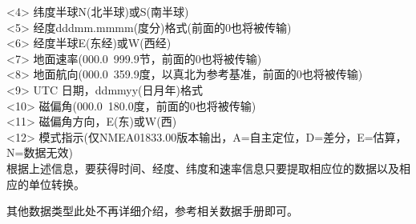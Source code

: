 \documentclass[a4paper, 12pt]{article}
\begin{document}
<4> 纬度半球N(北半球)或S(南半球)\\
<5> 经度dddmm.mmmm(度分)格式(前面的0也将被传输)\\
<6> 经度半球E(东经)或W(西经)\\
<7> 地面速率(000.0~999.9节，前面的0也将被传输)\\
<8> 地面航向(000.0~359.9度，以真北为参考基准，前面的0也将被传输)\\
<9> UTC 日期，ddmmyy(日月年)格式\\
<10> 磁偏角(000.0~180.0度，前面的0也将被传输)\\
<11> 磁偏角方向，E(东)或W(西)\\
<12> 模式指示(仅NMEA01833.00版本输出，A=自主定位，D=差分，E=估算，N=数据无效)\\
根据上述信息，要获得时间、经度、纬度和速率信息只要提取相应位的数据以及相应的单位转换。

其他数据类型此处不再详细介绍，参考相关数据手册即可。
\end{document}
